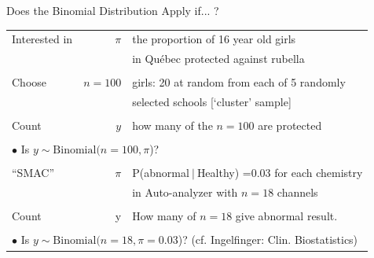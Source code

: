 \documentclass{beamer}\usepackage[]{graphicx}\usepackage[]{color}
\begin{document}
\begin{frame}{Does the Binomial Distribution Apply if... ?}

\small
\begin{tabular}{lrl}
	\hline
	Interested in & $\pi$      &  the proportion of 16 year old girls  \\
	&              &   in Qu\'{e}bec protected against rubella \\
	& & \\
	Choose        & $n=100$ & girls: 20 at random from each of 5 randomly \\
	&                &selected schools [`cluster' sample] \\
	& & \\
	Count & $y$ & how many of the $n=100$  are protected \\
	& & \\
	
	\multicolumn{3}{l}{$\bullet$ Is $y \sim \textrm{Binomial}(n = 100, \pi $)? } \\
	\hline
	& & \\
	``SMAC'' & $\pi$      &   P(abnormal$\:|\:$Healthy) =0.03 for each chemistry \\
	& &                       in Auto-analyzer with $n=18$ channels  \\
	&         &  \\
	Count            & y$ $&  How many of $n=18$  give abnormal result.  \\
	& & \\
	\multicolumn{3}{l}{$\bullet$ Is $y \sim \textrm{Binomial}(n = 18, \pi =0.03$)? (cf. Ingelfinger: Clin. Biostatistics) } 
\end{tabular}
\end{frame}
\end{document}
